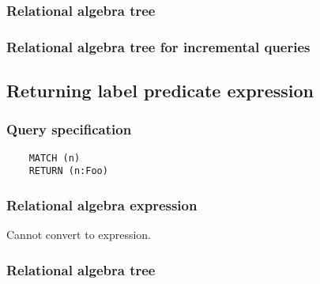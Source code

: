 	\subsubsection*{Relational algebra tree}


	\subsubsection*{Relational algebra tree for incremental queries}

	\subsection{Returning label predicate expression}

	\subsubsection*{Query specification}

	\begin{lstlisting}
	MATCH (n)
	RETURN (n:Foo)
	\end{lstlisting}


	\subsubsection*{Relational algebra expression}

	Cannot convert to expression.

	\subsubsection*{Relational algebra tree}

